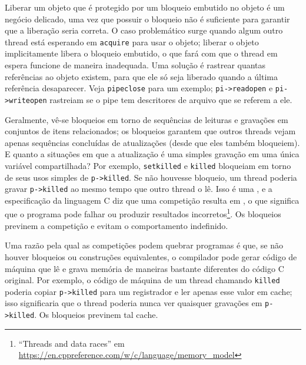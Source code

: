 Liberar um objeto que é protegido por um bloqueio embutido no objeto é um negócio delicado, uma vez que possuir o bloqueio não é suficiente para garantir que a liberação seria correta. O caso 
problemático surge quando algum outro thread está esperando em {\tt acquire} para usar o objeto; liberar o objeto implicitamente libera o bloqueio embutido, o que fará com que o thread em espera 
funcione de maneira inadequada. Uma solução é rastrear quantas referências ao objeto existem, para que ele só seja liberado quando a última referência desaparecer. Veja {\tt pipeclose} 
 para um exemplo; {\tt pi->readopen} e {\tt pi->writeopen} rastreiam se o pipe tem descritores de arquivo que se referem a ele.

Geralmente, vê-se bloqueios em torno de sequências de leituras e gravações em conjuntos de itens relacionados; os bloqueios garantem que outros threads vejam apenas sequências concluídas de 
atualizações (desde que eles também bloqueiem). E quanto a situações em que a atualização é uma simples gravação em uma única variável compartilhada? Por exemplo, 
\texttt{setkilled} e \texttt{killed}  bloqueiam em torno de seus usos simples de
\lstinline{p->killed}. Se não houvesse bloqueio, um thread poderia gravar 
\lstinline{p->killed} ao mesmo tempo que outro thread o lê. Isso é uma , e a especificação da linguagem C diz que uma competição resulta em , o que significa que o programa pode falhar ou produzir resultados incorretos\footnote{``Threads and data races'' em \url{
https://en.cppreference.com/w/c/language/memory_model}}. Os bloqueios previnem a competição e evitam o comportamento indefinido.

Uma razão pela qual as competições podem quebrar programas é que, se não houver bloqueios ou construções equivalentes, o compilador pode gerar código de máquina que lê e grava memória de maneiras 
bastante diferentes do código C original. Por exemplo, o código de máquina de um thread chamando
\texttt{killed} poderia copiar \lstinline{p->killed} para um registrador e
ler apenas esse valor em cache; isso significaria que o thread
poderia nunca ver quaisquer gravações em
\lstinline{p->killed}. Os bloqueios previnem tal cache.


